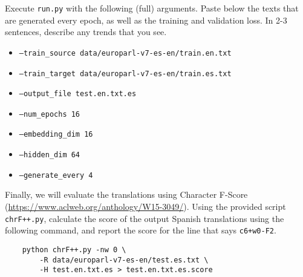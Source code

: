 \documentclass[11pt]{article}
\begin{document}
\vspace{2em}
  Execute \texttt{run.py} with the following (full) arguments. Paste below the texts that are generated every epoch, as well as the training and validation loss. In 2-3 sentences, describe any trends that you see.
\begin{itemize}
    \item \texttt{--train\_source data/europarl-v7-es-en/train.en.txt}
    \item \texttt{--train\_target data/europarl-v7-es-en/train.es.txt}
    \item \texttt{--output\_file test.en.txt.es}
    \item \texttt{--num\_epochs 16}
    \item \texttt{--embedding\_dim 16}
    \item \texttt{--hidden\_dim 64}
    \item \texttt{--generate\_every 4}
\end{itemize}

\vspace{2em}
 Finally, we will evaluate the translations using Character F-Score (\url{https://www.aclweb.org/anthology/W15-3049/}). Using the provided script \texttt{chrF++.py}, calculate the score of the output Spanish translations using the following command, and report the score for the line that says \texttt{c6+w0-F2}.
\begin{lstlisting}
    python chrF++.py -nw 0 \ 
        -R data/europarl-v7-es-en/test.es.txt \
        -H test.en.txt.es > test.en.txt.es.score
\end{lstlisting}
\end{document}

